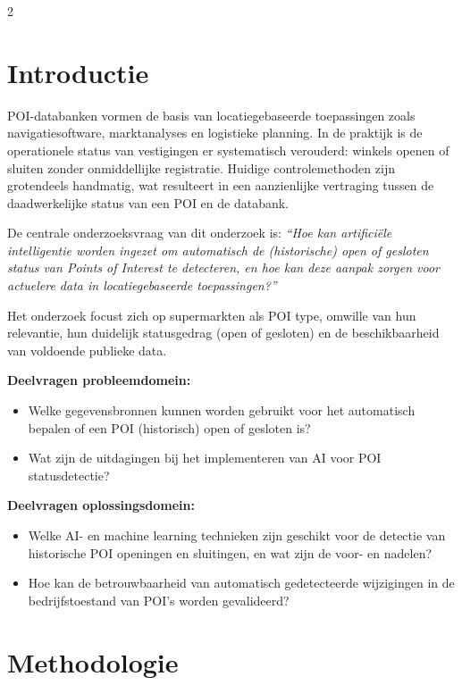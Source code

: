 \documentclass[a0,portrait]{hogent-poster}
\begin{document}
\begin{multicols}{2} %

\section{Introductie}

POI-databanken vormen de basis van locatiegebaseerde toepassingen zoals navigatiesoftware, marktanalyses en logistieke planning. In de praktijk is de operationele status van vestigingen er systematisch verouderd: winkels openen of sluiten zonder onmiddellijke registratie. Huidige controlemethoden zijn grotendeels handmatig, wat resulteert in een aanzienlijke vertraging tussen de daadwerkelijke status van een POI en de databank.

De centrale onderzoeksvraag van dit onderzoek is: \textit{``Hoe kan artificiële intelligentie worden ingezet om automatisch de (historische) open of gesloten status van Points of Interest te detecteren, en hoe kan deze aanpak zorgen voor actuelere data in locatiegebaseerde toepassingen?''}

Het onderzoek focust zich op supermarkten als POI type, omwille van hun relevantie, hun duidelijk statusgedrag (open of gesloten) en de beschikbaarheid van voldoende publieke data.

\textbf{Deelvragen probleemdomein:}
\begin{itemize}
    \item Welke gegevensbronnen kunnen worden gebruikt voor het automatisch bepalen of een POI (historisch) open of gesloten is?
    \item Wat zijn de uitdagingen bij het implementeren van AI voor POI statusdetectie?
\end{itemize}

\textbf{Deelvragen oplossingsdomein:}
\begin{itemize}
    \item Welke AI- en machine learning technieken zijn geschikt voor de detectie van historische POI openingen en sluitingen, en wat zijn de voor- en nadelen?
    \item Hoe kan de betrouwbaarheid van automatisch gedetecteerde wijzigingen in de bedrijfstoestand van POI's worden gevalideerd?
\end{itemize}

\section{Methodologie}


\end{multicols}
\end{document}
